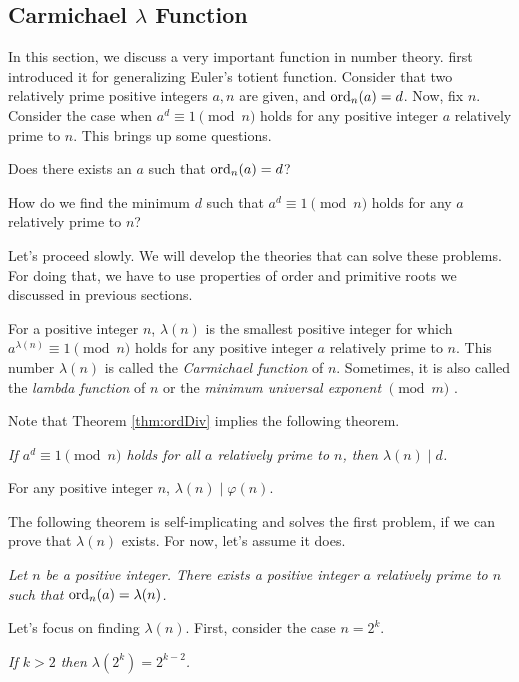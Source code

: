 \documentclass{subfile}
\begin{document}
	\subsection{Carmichael \texorpdfstring{$\lambda$}{Lambda} Function}
	In this section, we discuss a very important function in number theory. \textcite{carmichael_1910} first introduced it for generalizing Euler's totient function. Consider that two relatively prime positive integers $a,n$ are given, and $\operatorname{ord}_n(a)=d$. Now, fix $n$. Consider the case when $a^d\equiv1\pmod n$ holds for any positive integer $a$ relatively prime to $n$. This brings up some questions.
	\begin{problem}\label{prob:CarmichaelQuestion1}
		Does there exists an $a$ such that $\operatorname{ord}_n(a)=d$?
	\end{problem}

	\begin{problem}\label{prob:CarmichaelQuestion2}
		How do we find the minimum $d$ such that $a^d\equiv1\pmod n$ holds for any $a$ relatively prime to $n$?
	\end{problem}
	Let's proceed slowly. We will develop the theories that can solve these problems. For doing that, we have to use properties of order and primitive roots we discussed in previous sections.
	\begin{definition}
		For a positive integer $n$, $\lambda(n)$ is the smallest positive integer for which $a^{\lambda(n)}\equiv1\pmod n$ holds for any positive integer $a$ relatively prime to $n$. This number $\lambda(n)$ is called the \textit{Carmichael function} of $n$. Sometimes, it is also called the \textit{lambda function} of $n$ or the \textit{minimum universal exponent} $\pmod m$ \textcite[Chapter $\S$VI, Section $4$, Page $265$]{sierpinski_schinzel_1988}.
	\end{definition}
	Note that Theorem \eqref{thm:ordDiv} implies the following theorem.
	\begin{theorem}\slshape\label{thm:carDiv}
		If $a^d\equiv1\pmod n$ holds for all $a$ relatively prime to $n$, then $\lambda(n)\mid d$.
	\end{theorem}

	\begin{corollary}\label{cor:LambdaDividesPhi}
		For any positive integer $n$, $\lambda(n)\mid \varphi(n)$.
	\end{corollary}
	The following theorem is self-implicating and solves the first problem, if we can prove that $\lambda(n)$ exists. For now, let's assume it does.
	\begin{theorem}\slshape
		Let $n$ be a positive integer. There exists a positive integer $a$ relatively prime to $n$ such that $\operatorname{ord}_n(a)=\lambda(n)$.
	\end{theorem}
	Let's focus on finding $\lambda(n)$. First, consider the case $n=2^k$.
	\begin{theorem}\slshape
		If $k>2$ then $\lambda(2^k)=2^{k-2}$.
	\end{theorem}
\end{document}
